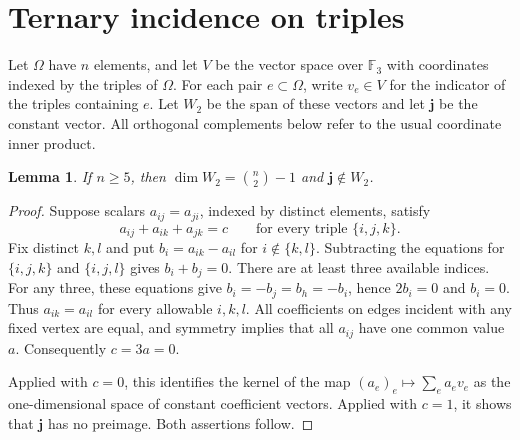 \documentclass[11pt,a4paper]{article}
\newtheorem{lemma}[theorem]{Lemma}
\numberwithin{equation}{section}
\begin{document}
\section{Ternary incidence on triples}

Let $\Omega$ have $n$ elements, and let $V$ be the vector space over
$\mathbb F_3$ with coordinates indexed by the triples of $\Omega$.
For each pair $e\subset\Omega$, write $v_e\in V$ for the indicator of
the triples containing $e$. Let $W_2$ be the span of these vectors and
let $\mathbf j$ be the constant vector. All orthogonal complements below
refer to the usual coordinate inner product.

\begin{lemma}\label{ULCD.TernaryIncidence}
If $n\geq5$, then $\dim W_2=\binom n2-1$ and
$\mathbf j\notin W_2$.
\end{lemma}
\begin{proof}
Suppose scalars $a_{ij}=a_{ji}$, indexed by distinct elements, satisfy
\[
 a_{ij}+a_{ik}+a_{jk}=c
 \qquad\text{for every triple }\{i,j,k\}.
\]
Fix distinct $k,l$ and put $b_i=a_{ik}-a_{il}$ for $i\notin\{k,l\}$.
Subtracting the equations for $\{i,j,k\}$ and $\{i,j,l\}$ gives
$b_i+b_j=0$. There are at least three available indices. For any three,
these equations give $b_i=-b_j=b_h=-b_i$, hence $2b_i=0$ and $b_i=0$.
Thus $a_{ik}=a_{il}$ for every allowable $i,k,l$. All coefficients on
edges incident with any fixed vertex are equal, and symmetry implies
that all $a_{ij}$ have one common value $a$. Consequently $c=3a=0$.

Applied with $c=0$, this identifies the kernel of the map
$(a_e)_e\mapsto\sum_e a_ev_e$ as the one-dimensional space of constant
coefficient vectors. Applied with $c=1$, it shows that $\mathbf j$ has
no preimage. Both assertions follow.
\end{proof}
\end{document}
